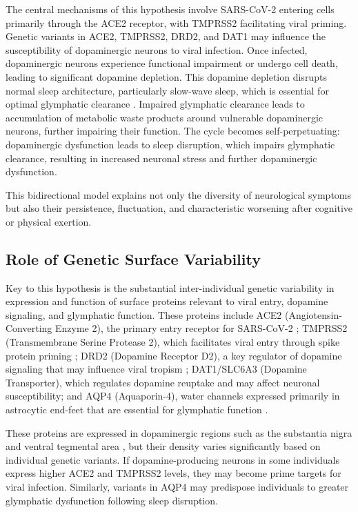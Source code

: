 \documentclass[12pt]{article}
\begin{document}
The central mechanisms of this hypothesis involve SARS-CoV-2 entering cells primarily through the ACE2 receptor, with TMPRSS2 facilitating viral priming. Genetic variants in ACE2, TMPRSS2, DRD2, and DAT1 may influence the susceptibility of dopaminergic neurons to viral infection. Once infected, dopaminergic neurons experience functional impairment or undergo cell death, leading to significant dopamine depletion. This dopamine depletion disrupts normal sleep architecture, particularly slow-wave sleep, which is essential for optimal glymphatic clearance \citep{Hablitz2019}. Impaired glymphatic clearance leads to accumulation of metabolic waste products around vulnerable dopaminergic neurons, further impairing their function. The cycle becomes self-perpetuating: dopaminergic dysfunction leads to sleep disruption, which impairs glymphatic clearance, resulting in increased neuronal stress and further dopaminergic dysfunction.

This bidirectional model explains not only the diversity of neurological symptoms but also their persistence, fluctuation, and characteristic worsening after cognitive or physical exertion.

\subsection{Role of Genetic Surface Variability}

Key to this hypothesis is the substantial inter-individual genetic variability in expression and function of surface proteins relevant to viral entry, dopamine signaling, and glymphatic function. These proteins include ACE2 (Angiotensin-Converting Enzyme 2), the primary entry receptor for SARS-CoV-2 \citep{cao2020ace2genetics, hou2021ace2variants}; TMPRSS2 (Transmembrane Serine Protease 2), which facilitates viral entry through spike protein priming \citep{asselta2020ace2tmprss2}; DRD2 (Dopamine Receptor D2), a key regulator of dopamine signaling that may influence viral tropism \citep{eisenstein2016drd2}; DAT1/SLC6A3 (Dopamine Transporter), which regulates dopamine reuptake and may affect neuronal susceptibility; and AQP4 (Aquaporin-4), water channels expressed primarily in astrocytic end-feet that are essential for glymphatic function \citep{Mestre2018}.

These proteins are expressed in dopaminergic regions such as the substantia nigra and ventral tegmental area \citep{song2021neuroinvasion, douaud2022brain}, but their density varies significantly based on individual genetic variants. If dopamine-producing neurons in some individuals express higher ACE2 and TMPRSS2 levels, they may become prime targets for viral infection. Similarly, variants in AQP4 may predispose individuals to greater glymphatic dysfunction following sleep disruption.
\end{document}
